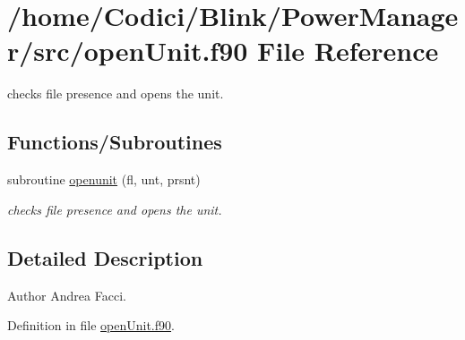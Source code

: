 \hypertarget{open_unit_8f90}{\section{/home/\-Codici/\-Blink/\-Power\-Manager/src/open\-Unit.f90 File Reference}
\label{open_unit_8f90}
}


checks file presence and opens the unit.  


\subsection*{Functions/\-Subroutines}
\begin{DoxyCompactItemize}
\item 
subroutine \hyperlink{open_unit_8f90_abaa0a5d0ffc5b96b5d090ddb8f7be6ad}{openunit} (fl, unt, prsnt)
\begin{DoxyCompactList}\small\item\em checks file presence and opens the unit. \end{DoxyCompactList}\end{DoxyCompactItemize}


\subsection{Detailed Description}
\begin{DoxyAuthor}{Author}
Andrea Facci. 
\end{DoxyAuthor}


Definition in file \hyperlink{open_unit_8f90_source}{open\-Unit.\-f90}.



